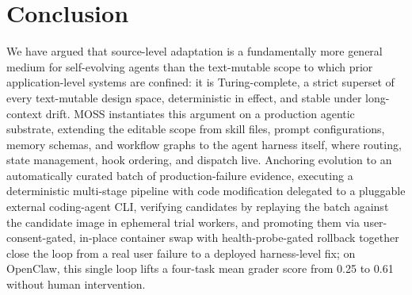\section{Conclusion}
\label{sec:conclusion}

We have argued that source-level adaptation is a fundamentally more general medium for self-evolving agents than the text-mutable scope to which prior application-level systems are confined: it is Turing-complete, a strict superset of every text-mutable design space, deterministic in effect, and stable under long-context drift. MOSS instantiates this argument on a production agentic substrate, extending the editable scope from skill files, prompt configurations, memory schemas, and workflow graphs to the agent harness itself, where routing, state management, hook ordering, and dispatch live. Anchoring evolution to an automatically curated batch of production-failure evidence, executing a deterministic multi-stage pipeline with code modification delegated to a pluggable external coding-agent CLI, verifying candidates by replaying the batch against the candidate image in ephemeral trial workers, and promoting them via user-consent-gated, in-place container swap with health-probe-gated rollback together close the loop from a real user failure to a deployed harness-level fix; on OpenClaw, this single loop lifts a four-task mean grader score from 0.25 to 0.61 without human intervention.
